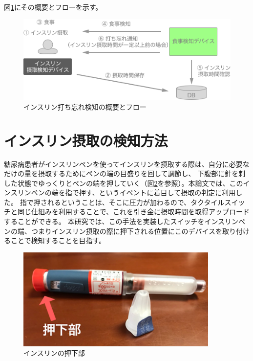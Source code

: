 図\ref{fig:insulin_design}にその概要とフローを示す。

\begin{figure}[htbp]
  \caption{インスリン打ち忘れ検知の概要とフロー}
  \label{fig:insulin_design}
  \begin{center}
    \includegraphics[bb=0 0 1000 530,width=15cm]{assets/insulin_design.png}
  \end{center}
\end{figure}

\section{インスリン摂取の検知方法}

糖尿病患者がインスリンペンを使ってインスリンを摂取する際は、自分に必要なだけの量を摂取するためにペンの端の目盛りを回して調節し、
下腹部に針を刺した状態でゆっくりとペンの端を押していく（図\ref{fig:insulin_pen_push}を参照）。本論文では、このインスリンペンの端を指で押す、というイベントに着目して摂取の判定に利用した。
指で押されるということは、そこに圧力が加わるので、タクタイルスイッチ\cite{tactile_switch}と同じ仕組みを利用することで、これを引き金に摂取時間を取得アップロードすることができる。
本研究では、この手法を実装したスイッチをインスリンペンの端、つまりインスリン摂取の際に押下される位置にこのデバイスを取り付けることで検知することを目指す。

\begin{figure}[htbp]
  \caption{インスリンの押下部}
  \label{fig:insulin_pen_push}
  \begin{center}
    \includegraphics[bb=0 0 1300 1000,width=10cm]{assets/insulin_pen_push.png}
  \end{center}
\end{figure}

